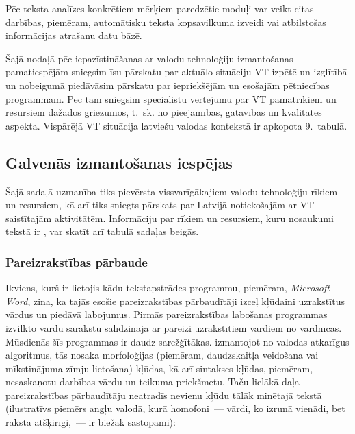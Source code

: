 \begin{multicols}{2}
Pēc teksta analīzes konkrētiem mērķiem paredzētie moduļi var veikt citas darbības, piemēram, automātisku teksta kopsavilkuma izveidi vai atbilstošas informācijas atrašanu datu bāzē. 

Šajā nodaļā pēc iepazīstināšanas ar valodu tehnoloģiju izmantošanas pamatiespējām sniegsim īsu pārskatu par aktuālo situāciju VT izpētē un izglītībā un nobeigumā piedāvāsim pārskatu par iepriekšējām un esošajām pētniecības programmām. 
Pēc tam sniegsim speciālistu vērtējumu par VT pamatrīkiem un resursiem dažādos griezumos, t.~sk. no pieejamības, gatavības un kvalitātes aspekta. 
Vispārējā VT situācija latviešu valodas kontekstā ir apkopota 9.~tabulā.

\subsection{Galvenās izmantošanas iespējas}

Šajā sadaļā uzmanība tiks pievērsta vissvarīgākajiem valodu tehnoloģiju rīkiem un resursiem, kā arī tiks sniegts pārskats par Latvijā notiekošajām ar VT saistītajām aktivitātēm.
Informāciju par rīkiem un resursiem, kuru nosaukumi tekstā ir , var skatīt arī tabulā sadaļas beigās. 


\subsubsection{Pareizrakstības pārbaude}

Ikviens, kurš ir lietojis kādu tekstapstrādes programmu, piemēram, \textit{Microsoft Word}, zina, ka tajās esošie pareizrakstības pārbaudītāji izceļ kļūdaini uzrakstītus vārdus un piedāvā labojumus.
Pirmās pareizrakstības labošanas programmas izvilkto vārdu sarakstu salīdzināja ar pareizi uzrakstītiem vārdiem no vārdnīcas.
Mūsdienās šīs programmas ir daudz sarežģītākas.
 izmantojot no valodas atkarīgus algoritmus, tās nosaka morfoloģijas (piemēram, daudzskaitļa veidošana vai mīkstinājuma zīmju lietošana) kļūdas, kā arī sintakses kļūdas, piemēram, nesaskaņotu darbības vārdu un teikuma priekšmetu.
Taču lielākā daļa pareizrakstības pārbaudītāju neatradīs nevienu kļūdu tālāk minētajā tekstā (ilustratīvs piemērs angļu valodā, kurā homofoni~--- vārdi, ko izrunā vienādi, bet raksta atšķirīgi,~--- ir biežāk sastopami):\\


\end{multicols}
